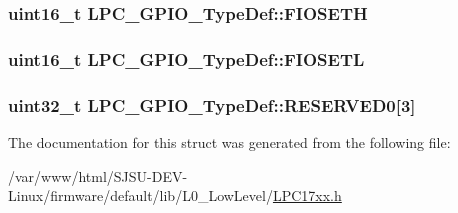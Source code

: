 \subsubsection[{\texorpdfstring{F\+I\+O\+S\+E\+TH}{FIOSETH}}]{ uint16\+\_\+t L\+P\+C\+\_\+\+G\+P\+I\+O\+\_\+\+Type\+Def\+::\+F\+I\+O\+S\+E\+TH}\hypertarget{structLPC__GPIO__TypeDef_aa6770bb087a4151525d8486b75810ba4}{}\label{structLPC__GPIO__TypeDef_aa6770bb087a4151525d8486b75810ba4}
\subsubsection[{\texorpdfstring{F\+I\+O\+S\+E\+TL}{FIOSETL}}]{ uint16\+\_\+t L\+P\+C\+\_\+\+G\+P\+I\+O\+\_\+\+Type\+Def\+::\+F\+I\+O\+S\+E\+TL}\hypertarget{structLPC__GPIO__TypeDef_a534316a1a2fe443f99700d2dc4a2fbea}{}\label{structLPC__GPIO__TypeDef_a534316a1a2fe443f99700d2dc4a2fbea}
\subsubsection[{\texorpdfstring{R\+E\+S\+E\+R\+V\+E\+D0}{RESERVED0}}]{\setlength{\rightskip}{0pt plus 5cm}uint32\+\_\+t L\+P\+C\+\_\+\+G\+P\+I\+O\+\_\+\+Type\+Def\+::\+R\+E\+S\+E\+R\+V\+E\+D0\mbox{[}3\mbox{]}}\hypertarget{structLPC__GPIO__TypeDef_a153fade589fd40270df4beb194fe0344}{}\label{structLPC__GPIO__TypeDef_a153fade589fd40270df4beb194fe0344}


The documentation for this struct was generated from the following file\+:\begin{DoxyCompactItemize}
\item 
/var/www/html/\+S\+J\+S\+U-\/\+D\+E\+V-\/\+Linux/firmware/default/lib/\+L0\+\_\+\+Low\+Level/\hyperlink{LPC17xx_8h}{L\+P\+C17xx.\+h}\end{DoxyCompactItemize}
